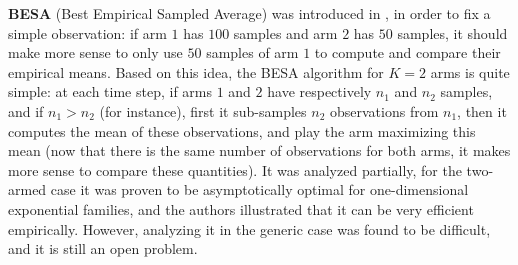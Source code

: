 \textbf{BESA} (Best Empirical Sampled Average) was introduced in \cite{Baransi2014}, in order to fix a simple observation:
if arm $1$ has $100$ samples and arm $2$ has $50$ samples, it should make more sense to only use $50$ samples of arm $1$ to compute and compare their empirical means.
Based on this idea, the BESA algorithm for $K=2$ arms is quite simple: at each time step, if arms $1$ and $2$ have respectively $n_1$ and $n_2$ samples, and if $n_1>n_2$ (for instance), first it sub-samples $n_2$ observations from $n_1$, then it computes the mean of these observations, and play the arm maximizing this mean (now that there is the same number of observations for both arms, it makes more sense to compare these quantities).
It was analyzed partially, for the two-armed case it was proven to be asymptotically optimal for one-dimensional exponential families, and the authors illustrated that it can be very efficient empirically.
However, analyzing it in the generic case was found to be difficult, and it is still an open problem.


